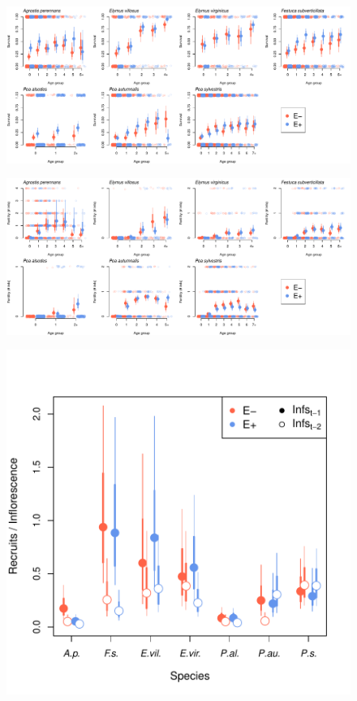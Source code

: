 \documentclass[11pt]{article}
\begin{document}
\begin{figure}
	\begin{center}
		\includegraphics[width=1\linewidth]{figures/age_specific_survival}
		\caption{}
		\label{fig:age_surv}
	\end{center}
\end{figure}


\begin{figure}
	\begin{center}
		\includegraphics[width=1\linewidth]{figures/age_specific_fertility}
		\caption{}
		\label{fig:age_surv}
	\end{center}
\end{figure}

\begin{figure}
	\begin{center}
		\includegraphics[width=0.75\linewidth]{figures/recruitment}
		\caption{}
		\label{fig:recruitment}
	\end{center}
\end{figure}
\end{document}
